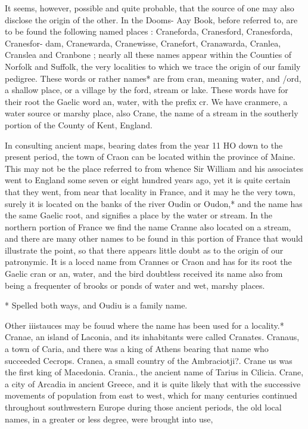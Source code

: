 \documentclass[oneside]{book}
\begin{document}
It seems, however, possible and quite probable, that the source 
of one may also disclose the origin of the other. In the Dooms- 
Aay Book, before referred to, are to be found the following 
named places : Craneforda, Cranesford, Cranesforda, Cranesfor- 
dam, Cranewarda, Cranewisse, Cranefort, Cranawarda, Cranlea, 
Cranslea and Cranbone ; nearly all these names appear within the 
Counties of Norfolk and Suffolk, the very localities to which we 
trace the origin of our family pedigree. These words or rather 
names* are from cran, meaning water, and /ord, a shallow place, 
or a village by the ford, stream or lake. These words have for 
their root the Gaelic word an, water, with the prefix cr. We 
have cranmere, a water source or marshy place, also Crane, the 
name of a stream in the southerly portion of the County of Kent, 
England. 

In consulting ancient maps, bearing dates from the year 11 HO 
down to the present period, the town of Craon can be located 
within the province of Maine. This may not be the place referred 
to from whence Sir William and his associates went to England 
some seven or eight hundred years ago, yet it is quite certain that 
they went, from near that locality in France, and it may he the 
very town, surely it is located on the banks of the river Oudin or 
Oudon,* and the name has the same Gaelic root, and signifies a 
place by the water or stream. In the northern portion of France 
we find the name Cranne also located on a stream, and there are 
many other names to be found in this portion of France that 
would illustrate the point, so that there appears little doubt as to 
the origin of our patronymic. It is a loccd name from Crannes 
or Craon and has for its root the Gaelic cran or an, water, and 
the bird doubtless received its name also from being a frequenter 
of brooks or ponds of water and wet, marshy places. 

* Spelled both ways, and Oudiu is a family name. 




Other iiistauces may be fouud where the name has been used 
for a locality.* Cranae, an island of Laconia, and its inhabitants 
were called Cranates. Cranaus, a town of Caria, and there was 
a king of Athens bearing that name who succeeded Cecrops. 
Cranea, a small country of the Ambraciotji?. Crane us was the 
first king of Macedonia. Crania., the ancient name of Tarius in 
Cilicia. Crane, a city of Arcadia in ancient Greece, and it is 
quite likely that with the successive movements of population 
from east to west, which for many centuries continued throughout 
southwestern Europe during those ancient periods, the old local 
names, in a greater or less degree, were brought into use, 
\end{document}
